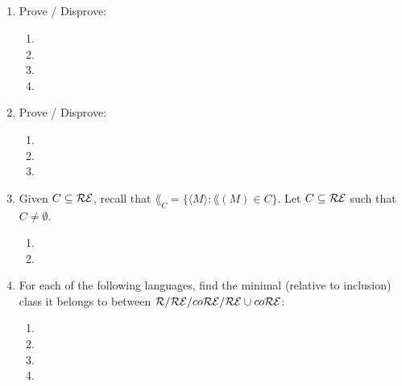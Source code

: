 \documentclass{article}
\title{
    \textmd{\bd{\hmwkClass:\ \hmwkTitle}}\\
}
\author{\hmwkAuthorName}
\begin{document}
\maketitle

\begin{enumerate}
      \item Prove / Disprove:
            \begin{enumerate}
                  \item 
                  \item 
                  \item 
                  \item 
            \end{enumerate}

            \pagebreak

      \item Prove / Disprove:
            \begin{enumerate}
                  \item 
                  \item 
                  \item 
            \end{enumerate}

            \pagebreak

      \item Given $C \subseteq \mathcal{R}\mathcal{E}$, recall that $\lang_C = \{\langle M \rangle : \lang(M) \in C\}$.
            Let $C \subseteq \mathcal{R}\mathcal{E}$ such that $ C \neq \emptyset$.
            \begin{enumerate}
                  \item 
                  \item 
            \end{enumerate}

            \pagebreak

      \item For each of the following languages, find the minimal (relative to inclusion)
            class it belongs to between $\mathcal{R}/\mathcal{R}\mathcal{E}/co\mathcal{R}\mathcal{E}/\mathcal{R}\mathcal{E} \cup co\mathcal{R}\mathcal{E}$:
            \begin{enumerate}
                  \item 
                  \item 
                  \item 
                  \item 
            \end{enumerate}


\end{enumerate}
\end{document}
